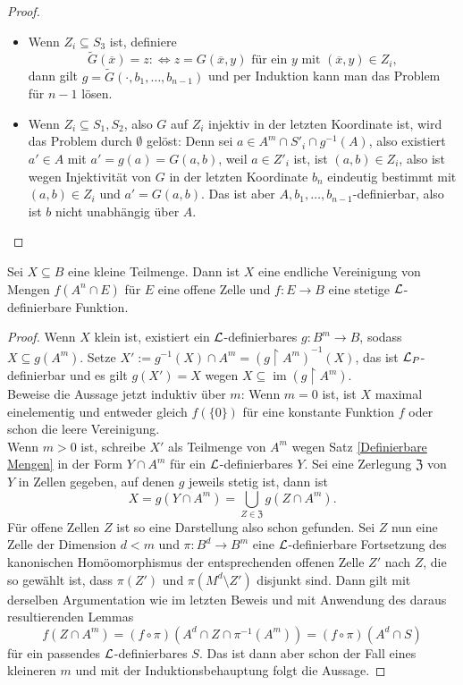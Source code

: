 \begin{proof}
\begin{itemize}
\begin{itemize}
			\begin{itemize}
				\item Wenn $Z_i\subseteq S_3$ ist, definiere $$\tilde{G}(\overline{x})=z:\Leftrightarrow z=G(\overline{x},y)\text{ für ein }y\text{ mit }(\overline{x},y)\in Z_i,$$ dann gilt $g=\tilde{G}(\cdot,b_1,\dots,b_{n-1})$ und per Induktion kann man das Problem für $n-1$ lösen.
				\item Wenn $Z_i\subseteq S_1,S_2$, also $G$ auf $Z_i$ injektiv in der letzten Koordinate ist, wird das Problem durch $\emptyset$ gelöst: Denn sei $a\in A^m\cap S'_i\cap g^{-1}(A)$, also existiert $a'\in A$ mit $a'=g(a)=G(a,b)$, weil $a\in Z'_i$ ist, ist $(a,b)\in Z_i$, also ist wegen Injektivität von $G$ in der letzten Koordinate $b_n$ eindeutig bestimmt mit $(a,b)\in Z_i$ und $a'=G(a,b)$. Das ist aber $A,b_1,\dots,b_{n-1}$-definierbar, also ist $b$ nicht unabhängig über $A$.
			\end{itemize}
		\end{itemize}
	\end{itemize}
\end{proof}

\begin{lemma}
	Sei $X\subseteq B$ eine kleine Teilmenge. Dann ist $X$ eine endliche Vereinigung von Mengen $f(A^n\cap E)$ für $E$ eine offene Zelle und $f:E\rightarrow B$ eine stetige $\mathcal{L}$-definierbare Funktion.
\end{lemma}
\begin{proof}
	Wenn $X$ klein ist, existiert ein $\mathcal{L}$-definierbares $g:B^m\rightarrow B$, sodass $X\subseteq g(A^m)$. Setze $X':=g^{-1}(X)\cap A^m=(g\upharpoonright A^m)^{-1}(X)$, das ist $\mathcal{L}_P$-definierbar und es gilt $g(X')=X$ wegen $X\subseteq\operatorname{im}(g\upharpoonright A^m)$.\\
	Beweise die Aussage jetzt induktiv über $m$: Wenn $m=0$ ist, ist $X$ maximal einelementig und entweder gleich $f(\{0\})$ für eine konstante Funktion $f$ oder schon die leere Vereinigung.\\
	Wenn $m>0$ ist, schreibe $X'$ als Teilmenge von $A^m$ wegen Satz \ref{Definierbare Mengen} in der Form $Y\cap A^m$ für ein $\mathcal{L}$-definierbares $Y$. Sei eine Zerlegung $\mathfrak{Z}$ von $Y$ in Zellen gegeben, auf denen $g$ jeweils stetig ist, dann ist $$X=g(Y\cap A^m)=\bigcup\limits_{Z\in\mathfrak{Z}}g(Z\cap A^m).$$
	Für offene Zellen $Z$ ist so eine Darstellung also schon gefunden. Sei $Z$ nun eine Zelle der Dimension $d<m$ und $\pi:B^d\rightarrow B^m$ eine $\mathcal{L}$-definierbare Fortsetzung des kanonischen Homöomorphismus der entsprechenden offenen Zelle $Z'$ nach $Z$, die so gewählt ist, dass $\pi(Z')$ und $\pi(M^d\setminus Z')$ disjunkt sind. Dann gilt mit derselben Argumentation wie im letzten Beweis und mit Anwendung des daraus resultierenden Lemmas $$f(Z\cap A^m)=(f\circ\pi)(A^d\cap Z\cap\pi^{-1}(A^m))=(f\circ\pi)(A^d\cap S)$$ für ein passendes $\mathcal{L}$-definierbares $S$. Das ist dann aber schon der Fall eines kleineren $m$ und mit der Induktionsbehauptung folgt die Aussage.
\end{proof}

